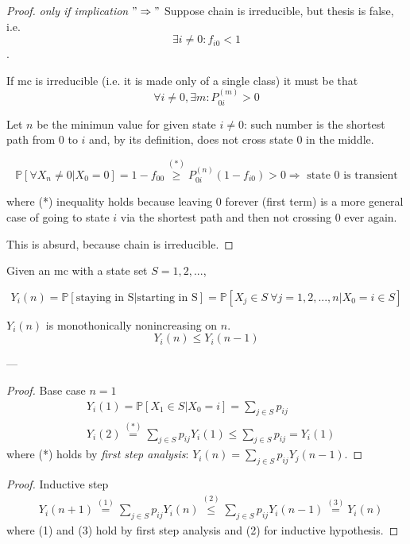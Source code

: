 	\begin{proof} \emph{only if implication} $"\Rightarrow"$
		Suppose chain is irreducible, but thesis is false, i.e.
		$$ \exists i \neq 0 : f_{i0} < 1 $$.

		If \gls{mc} is irreducible (i.e. it is made only of a single class) it must be that
		$$ \forall i \neq 0, \exists m : P_{0i}^{(m)} > 0 $$

		Let $n$ be the minimun value for given state $i \neq 0$: such number is the shortest path from 0 to $i$ and, by its definition, does not cross state 0 in the middle.

		$$ \mathbb{P}[\forall X_n \neq 0 | X_0 = 0] = 1 - f_{00} \stackrel{(*)}{\ge} P_{0i}^{(n)} (1 - f_{i0}) > 0 \Rightarrow \text{ state 0 is transient} $$

		where (*) inequality holds because leaving 0 forever (first term) is a more general case of going to state $i$ via the shortest path and then not crossing 0 ever again.

		This is absurd, because chain is irreducible.
	\end{proof}

	\begin{definition}
		Given an \gls{mc} with a state set $S = 1, 2, ...$,

		$$ Y_i(n) = \mathbb{P}[\text{staying in S} | \text{starting in S}] = \mathbb{P}[X_j \in S ~\forall j=1, 2, ..., n | X_0 = i \in S] $$
	\end{definition}

	\begin{theorem}
		$Y_i(n)$ is monothonically nonincreasing on $n$.
		$$ Y_i(n) \le Y_i(n-1) $$
	\end{theorem}
	---
	\begin{proof} Base case $n=1$
		\begin{equation}\begin{split}
			& Y_i(1) = \mathbb{P}[X_1 \in S | X_0 = i] = \sum_{j \in S} p_{ij} \\
			& Y_i(2) \stackrel{(*)}{=} \sum_{j \in S} p_{ij} Y_i(1) \le \sum_{j \in S} p_{ij} = Y_i(1)
		\end{split}\end{equation}
		where (*) holds by \emph{first step analysis}: $ Y_i(n) = \sum_{j \in S} p_{ij} Y_j(n-1) $.
	\end{proof}

	\begin{proof} Inductive step
		\begin{equation}\begin{split}
			& Y_i(n+1) \stackrel{(1)}{=} \sum_{j \in S} p_{ij} Y_i(n) \stackrel{(2)}{\le} \sum_{j \in S} p_{ij} Y_i(n-1) \stackrel{(3)}{=} Y_i(n)
		\end{split}\end{equation}
		where (1) and (3) hold by first step analysis and (2) for inductive hypothesis.
	\end{proof}

